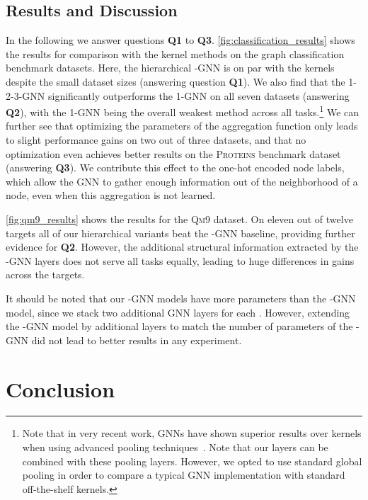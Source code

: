 \documentclass[letterpaper]{article}
\theoremstyle{definition}
\begin{document}
\subsection{Results and Discussion}

In the following we answer questions \textbf {Q1} to \textbf{Q3}. \cref{fig:classification_results} shows the results for comparison with the kernel methods on the graph classification benchmark datasets. Here, the hierarchical -GNN is on par with the kernels despite the small dataset sizes (answering question \textbf{Q1}).
We also find that the 1-2-3-GNN significantly outperforms the 1-GNN on all seven datasets (answering \textbf{Q2}), with the 1-GNN being the overall weakest method across all tasks.\footnote{Note that in very recent work, GNNs have shown superior results over kernels when using advanced pooling techniques~\cite{Yin+2018}. Note that our layers can be combined with these pooling layers. However, we opted to use standard global pooling in order to compare a typical GNN implementation with standard off-the-shelf kernels.}
We can further see that optimizing the parameters of the aggregation function only leads to slight performance gains on two out of three datasets, and that no optimization even achieves better results on the \textsc{Proteins} benchmark dataset (answering \textbf{Q3}).
We contribute this effect to the one-hot encoded node labels, which allow the GNN to gather enough information out of the neighborhood of a node, even when this aggregation is not learned.

\cref{fig:qm9_results} shows the results for the \textsc{Qm9} dataset. On eleven out of twelve targets all of our hierarchical variants beat the -GNN baseline, providing further evidence for \textbf{Q2}. 
However, the additional structural information extracted by the -GNN layers does not serve all tasks equally, leading to huge differences in gains across the targets.

It should be noted that our -GNN models have more parameters than the -GNN model, since we stack two additional GNN layers for each . However, extending the -GNN model by additional layers to match the number of parameters of the -GNN did not lead to better results in any experiment.


\section{Conclusion}
\end{document}
